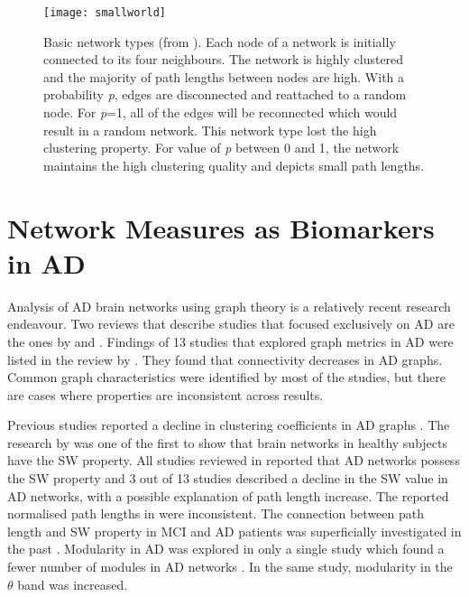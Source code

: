 	\begin{figure}
		    \centering
		    \texttt{[image: smallworld]}
		    \caption{Basic network types (from \textcite{Watts1998}). Each node of a network is initially connected to its four neighbours. The network is highly clustered and the majority of path lengths between nodes are high. With a probability \textit{p}, edges are disconnected and reattached to a random node. For \textit{p}=1, all of the edges will be reconnected which would result in a random network. This network type lost the high clustering property. For value of \textit{p} between 0 and 1, the network maintains the high clustering quality and depicts small path lengths.}
		    \label{fig:smallworld}
	\end{figure}   

	
	\section{Network Measures as Biomarkers in AD}
	Analysis of \ac{AD} brain networks using graph theory is a relatively recent research endeavour. Two reviews that describe studies that focused exclusively on \ac{AD} are the ones by \textcite{He2009} and \textcite{Xie2011}. Findings of 13 studies that explored graph metrics in \ac{AD} were listed in the review by \textcite{Tijms2013}. They found that connectivity decreases in \ac{AD} graphs. Common graph characteristics were identified by most of the studies, but there are cases where properties are inconsistent across results.

	Previous studies reported a decline in clustering coefficients in \ac{AD} graphs \autocite{He2009,DeHaan2012a}. The research by \textcite{Stam2004} was one of the first to show that brain networks in healthy subjects have the \ac{SW} property. All studies reviewed in \textcite{Tijms2013} reported that \ac{AD} networks possess the \ac{SW} property and 3 out of 13 studies described a decline in the \ac{SW} value in \ac{AD} networks, with a possible explanation of path length increase. The reported normalised path lengths in \textcite{Tijms2013} were inconsistent. The connection between path length and \ac{SW} property in \ac{MCI} and \ac{AD} patients was superficially investigated in the past \autocite{Tijms2013}. 
	Modularity in \ac{AD} was explored in only a single study which found a fewer number of modules in \ac{AD} networks \autocite{DeHaan2012b}. In the same study, modularity in the \(\theta\) band was increased.    

